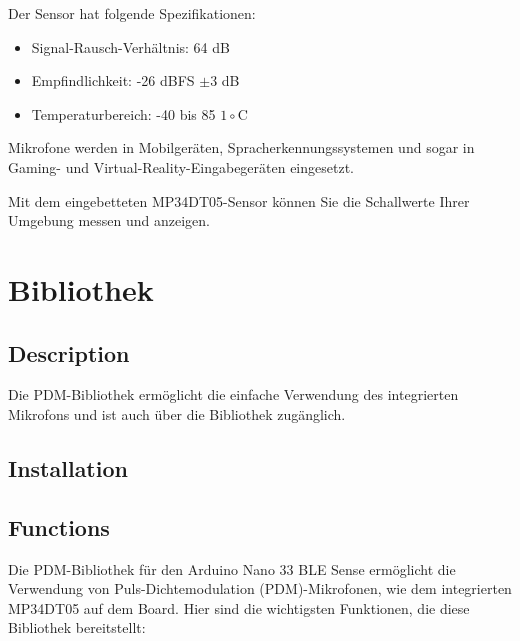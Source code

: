  Der Sensor hat folgende Spezifikationen:
 
\begin{itemize}
  \item Signal-Rausch-Verhältnis: 64 dB
  \item Empfindlichkeit: -26 dBFS $\pm 3$ dB
  \item Temperaturbereich: -40 bis 85 $1\circ$C
\end{itemize}

Mikrofone werden in Mobilgeräten, Spracherkennungssystemen und sogar in Gaming- und Virtual-Reality-Eingabegeräten eingesetzt.

Mit dem eingebetteten MP34DT05-Sensor können Sie die Schallwerte Ihrer Umgebung messen und anzeigen.


\section{Bibliothek }

\subsection{Description}

Die PDM-Bibliothek ermöglicht die einfache Verwendung des integrierten Mikrofons und ist auch über die Bibliothek  zugänglich.

\subsection{Installation}

\subsection{Functions}

Die PDM-Bibliothek für den Arduino Nano 33 BLE Sense ermöglicht die Verwendung von Puls-Dichtemodulation (PDM)-Mikrofonen, wie dem integrierten MP34DT05 auf dem Board. Hier sind die wichtigsten Funktionen, die diese Bibliothek bereitstellt:

